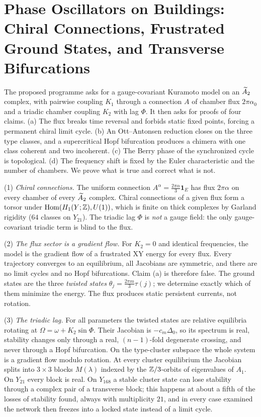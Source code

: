 \chapter{Phase Oscillators on Buildings: Chiral Connections, Frustrated Ground States, and Transverse Bifurcations}\label{chap:V3P3}
\begin{chapterabstract}
The proposed programme asks for a gauge-covariant Kuramoto model on an $\widetilde A_2$ complex, with pairwise
coupling $K_1$ through a connection $A$ of chamber flux $2\pi\alpha_0$ and a triadic chamber
coupling $K_2$ with lag $\Phi$. It then asks for proofs of four claims. (a) The flux breaks
time reversal and forbids static fixed points, forcing a permanent chiral limit cycle. (b) An
Ott--Antonsen reduction closes on the three type classes, and a supercritical Hopf
bifurcation produces a chimera with one class coherent and two incoherent. (c) The Berry phase
of the synchronized cycle is topological. (d) The frequency shift is fixed by the Euler
characteristic and the number of chambers. We prove what is true and correct what is not.

(1) \emph{Chiral connections.} The uniform connection $A^{\alpha}=\frac{2\pi\alpha}{3}\mathbf
1_E$ has flux $2\pi\alpha$ on every chamber of every $\widetilde A_2$ complex. Chiral connections of a
given flux form a torsor under $\operatorname{Hom}(H_1(Y;\mathbb{Z}),U(1))$, which is finite on thick complexes by
Garland rigidity ($64$ classes on $Y_{21}$). The triadic lag $\Phi$ is \emph{not} a gauge
field: the only gauge-covariant triadic term is blind to the flux.

(2) \emph{The flux sector is a gradient flow.} For $K_2=0$ and identical frequencies, the
model is the gradient flow of a frustrated XY energy for every flux. Every trajectory
converges to an equilibrium, all Jacobians are symmetric, and there are no limit cycles and
no Hopf bifurcations. Claim (a) is therefore false. The ground states are the three
\emph{twisted states} $\theta_j=\frac{2\pi m}{3}\tau(j)$; we determine exactly which of them
minimize the energy. The flux produces static persistent currents, not rotation.

(3) \emph{The triadic lag.} For all parameters the twisted states are relative equilibria
rotating at $\Omega=\omega+K_2\sin\Phi$. Their Jacobian is $-c_m\Delta_0$, so its spectrum is
real, stability changes only through a real, $(n-1)$-fold degenerate crossing, and never
through a Hopf bifurcation. On the type-cluster subspace the whole system is a gradient flow
modulo rotation. At every cluster equilibrium the Jacobian splits into $3\times3$ blocks
$M(\lambda)$ indexed by the $\mathbb{Z}/3$-orbits of eigenvalues of $A_1$. On $Y_{21}$ every block is
real. On $Y_{168}$ a stable cluster state can lose stability through a complex pair of a transverse
block; this happens at about a fifth of the losses of stability found, always with multiplicity $21$,
and in every case examined the network then freezes into a locked state instead of a limit cycle.


\end{chapterabstract}
